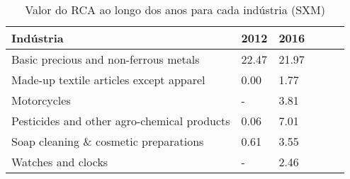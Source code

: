\begin{table}
\centering
\caption{Valor do RCA ao longo dos anos para cada indústria (SXM)}
\begin{tabular}{p{6cm}p{1.5cm}p{1.5cm}p{1.5cm}p{1.5cm}p{1.5cm}}
\toprule
                                  Indústria &  2012 &  2016 \\
\midrule
      Basic precious and non-ferrous metals & 22.47 & 21.97 \\
    Made-up textile articles except apparel &  0.00 &  1.77 \\
                                Motorcycles &     - &  3.81 \\
Pesticides and other agro-chemical products &  0.06 &  7.01 \\
      Soap cleaning \& cosmetic preparations &  0.61 &  3.55 \\
                         Watches and clocks &     - &  2.46 \\
\bottomrule
\end{tabular}
\end{table}
